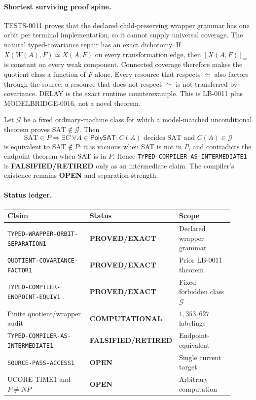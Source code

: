 \documentclass[11pt]{article}
\begin{document}
\paragraph{Shortest surviving proof spine.}
TESTS-0011 proves that the declared child-preserving wrapper grammar has one
orbit per terminal implementation, so it cannot supply universal coverage.
The natural typed-covariance repair has an exact dichotomy.  If
$X(W(A),F)\simeq X(A,F)$ on every transformation edge, then
$[X(A,F)]_{\simeq}$ is constant on every weak component.  Connected coverage
therefore makes the quotient class a function of $F$ alone.  Every resource
that respects $\simeq$ also factors through the source; a resource that does
not respect $\simeq$ is not transferred by covariance.  DELAY is the exact
runtime counterexample.  This is LB-0011 plus MODELBRIDGE-0016, not a novel
theorem.

Let $\mathcal G$ be a fixed ordinary-machine class for which a model-matched
unconditional theorem proves $\mathrm{SAT}\notin\mathcal G$.  Then
\[
 \mathrm{SAT}\in P\Rightarrow
 \exists C\ \forall A\in\mathsf{PolySAT}:
 C(A)\text{ decides SAT and }C(A)\in\mathcal G
\]
is equivalent to $\mathrm{SAT}\notin P$: it is vacuous when SAT is not in
$P$, and contradicts the endpoint theorem when SAT is in $P$.  Hence
\texttt{TYPED-COMPILER-AS-INTERMEDIATE1} is
\textbf{FALSIFIED/RETIRED} only as an intermediate claim.  The compiler's
existence remains \textbf{OPEN} and separation-strength.

\paragraph{Status ledger.}
\begin{center}\small
\begin{tabular}{p{0.43\linewidth}p{0.21\linewidth}p{0.27\linewidth}}
\hline
Claim & Status & Scope \\\hline
\texttt{TYPED-WRAPPER-ORBIT-SEPARATION1} & \textbf{PROVED/EXACT} & Declared wrapper grammar \\
\texttt{QUOTIENT-COVARIANCE-FACTOR1} & \textbf{PROVED/EXACT} & Prior LB-0011 theorem \\
\texttt{TYPED-COMPILER-ENDPOINT-EQUIV1} & \textbf{PROVED/EXACT} & Fixed forbidden class $\mathcal G$ \\
Finite quotient/wrapper audit & \textbf{COMPUTATIONAL} & $1{,}353{,}627$ labelings \\
\texttt{TYPED-COMPILER-AS-INTERMEDIATE1} & \textbf{FALSIFIED/RETIRED} & Endpoint-equivalent \\
\texttt{SOURCE-PASS-ACCESS1} & \textbf{OPEN} & Single current target \\
UCORE-TIME1 and $P\ne NP$ & \textbf{OPEN} & Arbitrary computation \\\hline
\end{tabular}
\end{center}
\end{document}
